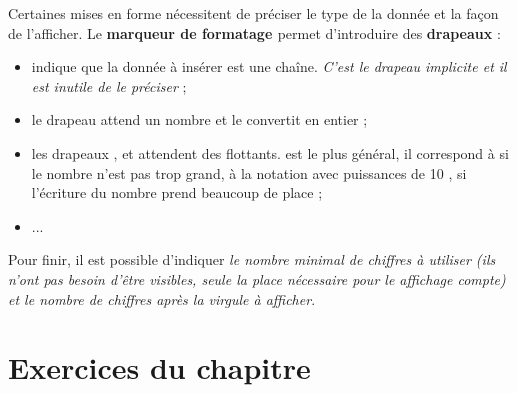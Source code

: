\documentclass{article}
\newcommand{\tmem}[1]{{\em #1\/}}
\newcommand{\tmtextbf}[1]{{\bfseries{#1}}}
\newcommand{\tmtexttt}[1]{{\ttfamily{#1}}}
\newenvironment{itemizeminus}{\begin{itemize} \renewcommand{\labelitemi}{$-$}\renewcommand{\labelitemii}{$-$}\renewcommand{\labelitemiii}{$-$}\renewcommand{\labelitemiv}{$-$}}{\end{itemize}}
\begin{document}
Certaines mises en forme nécessitent de préciser le type de la donnée et la
façon de l'afficher. Le \tmtextbf{marqueur de formatage \tmtexttt{:}} permet
d'introduire des \tmtextbf{drapeaux} :
\begin{itemizeminus}
  \item \tmtexttt{s} indique que la donnée à insérer est une chaîne.
  {\tmem{C'est le drapeau implicite et il est inutile de le préciser}} ;
  
  \item le drapeau \tmtexttt{d} attend un nombre et le convertit en entier ;
  
  \item les drapeaux \tmtexttt{f}, \tmtexttt{g} et \tmtexttt{e} attendent des
  flottants. \tmtexttt{g} est le plus général, il correspond à \tmtexttt{f}
  si le nombre n'est pas trop grand, à la notation avec puissances de 10
  \tmtexttt{e}, si l'écriture du nombre prend beaucoup de place ;
  
  \item ...
\end{itemizeminus}
Pour finir, il est possible d'indiquer {\tmem{le nombre minimal de chiffres à
utiliser (ils n'ont pas besoin d'être visibles, seule la place nécessaire
pour le affichage compte) et le nombre de chiffres après la virgule à
afficher}}.

{}

\section{Exercices du chapitre}
\end{document}
